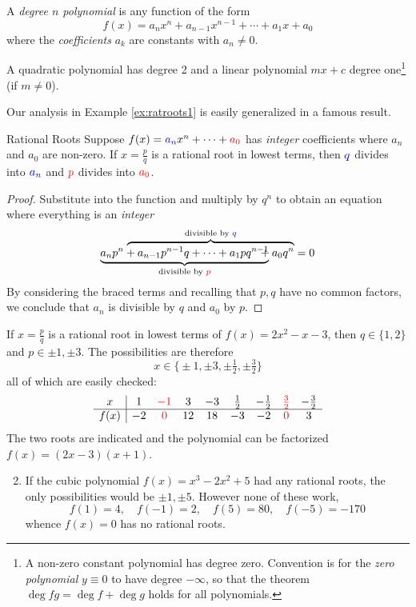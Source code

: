\goodbreak

\begin{defn}{}{}
	A \emph{degree $n$ polynomial} is any function of the form
	\[
		f(x)=a_nx^n+a_{n-1}x^{n-1}+\cdots+a_1x+a_0
	\]
	where the \emph{coefficients} $a_k$ are constants with $a_n\neq 0$.
\end{defn}

A quadratic polynomial has degree 2 and a linear polynomial $mx+c$ degree one\footnote{A non-zero constant polynomial has degree zero. Convention is for the \emph{zero polynomial} $y\equiv 0$ to have degree $-\infty$, so that the theorem $\operatorname{deg} fg=\operatorname{deg} f+\operatorname{deg} g$ holds for all polynomials.} (if $m\neq 0$).\smallbreak

Our analysis in Example \ref{ex:ratroots1} is easily generalized in a famous result.

\begin{thm}{Rational Roots}{}
	Suppose $f(x)=\textcolor{blue}{a_n}x^n+\cdots+\textcolor{red}{a_0}$ has \emph{integer} coefficients where $a_n$ and $a_0$ are non-zero. If $x=\frac pq$ is a rational root in lowest terms, then $\textcolor{blue}{q}$ divides into $\textcolor{blue}{a_n}$ and $\textcolor{red}{p}$ divides into $\textcolor{red}{a_0}$.
\end{thm}

\begin{proof}
	Substitute into the function and multiply by $q^n$ to obtain an equation where everything is an \emph{integer}\vspace{-10pt}
	\[
		\underbrace{a_np^n+a_{n-1}p^{n-1}q+\cdots+a_1pq^{n-1}}_{\text{divisible by $\textcolor{red}{p}$}} \hspace{-129pt} \overbrace{\phantom{a_{n-1}p^{n-1}q+\cdots+a_1pq^{n-1}}+a_0q^n}^{\text{divisible by $\textcolor{blue}{q}$}}=0
	\]
	By considering the braced terms and recalling that $p,q$ have no common factors, we conclude that $a_n$ is divisible by $q$ and $a_0$ by $p$.
\end{proof}


\begin{examples}{}{}
	\exstart If $x=\frac pq$ is a rational root in lowest terms of $f(x)=2x^2-x-3$, then $q\in\{1,2\}$ and $p\in{\pm 1,\pm 3}$. The possibilities are therefore
	\[
		x\in\bigl\{\pm 1,\pm 3,\pm\tfrac 12,\pm\tfrac 32\bigr\}
	\]
	all of which are easily checked:
	\[
		\begin{array}{c|cccccccc}
			x&1&\textcolor{red}{-1}&3&-3&\frac 12&-\frac 12&\textcolor{red}{\frac 32}&-\frac 32\\\hline
			f(x)&-2&\textcolor{red}{0}&12&18&-3&-2&\textcolor{red}{0}&3
		\end{array}
	\]
	The two roots are indicated and the polynomial can be factorized $f(x)=(2x-3)(x+1)$.
	\begin{enumerate}\setcounter{enumi}{1}
	  \item If the cubic polynomial $f(x)=x^3-2x^2+5$ had any rational roots, the only  possibilities would be $\pm 1, \pm 5$. However none of these work,
	  \[
	  	f(1)=4,\quad f(-1)=2,\quad f(5)=80,\quad f(-5)=-170
	  \]
	  whence $f(x)=0$ has no rational roots.
	\end{enumerate}
\end{examples}

